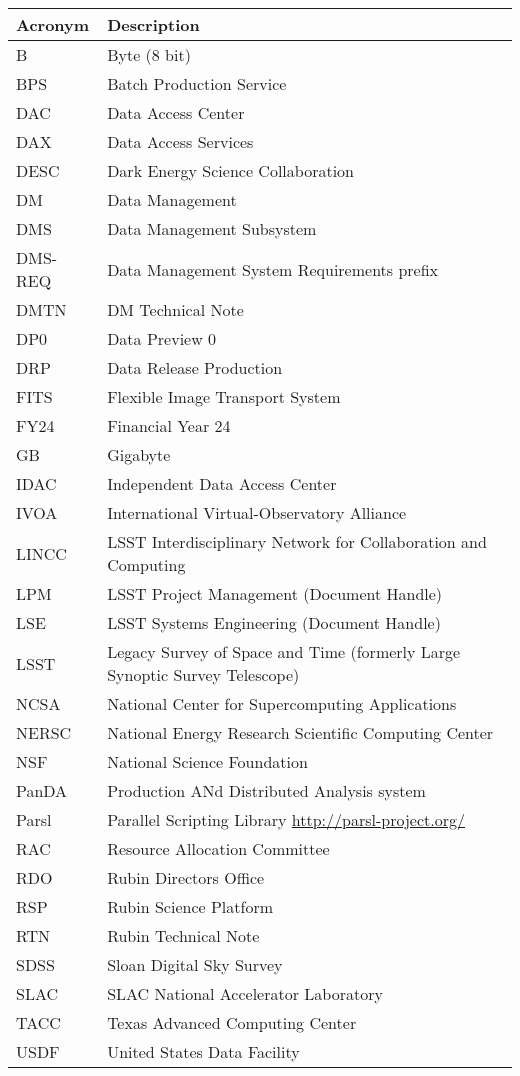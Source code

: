 \addtocounter{table}{-1}
\begin{longtable}{p{}p{}}\hline
\textbf{Acronym} & \textbf{Description}  \\\hline

B & Byte (8 bit) \\\hline
BPS & Batch Production Service \\\hline
DAC & Data Access Center \\\hline
DAX & Data Access Services \\\hline
DESC & Dark Energy Science Collaboration \\\hline
DM & Data Management \\\hline
DMS & Data Management Subsystem \\\hline
DMS-REQ & Data Management System Requirements prefix \\\hline
DMTN & DM Technical Note \\\hline
DP0 & Data Preview 0 \\\hline
DRP & Data Release Production \\\hline
FITS & Flexible Image Transport System \\\hline
FY24 & Financial Year 24 \\\hline
GB & Gigabyte \\\hline
IDAC & Independent Data Access Center \\\hline
IVOA & International Virtual-Observatory Alliance \\\hline
LINCC & LSST Interdisciplinary Network for Collaboration and Computing \\\hline
LPM & LSST Project Management (Document Handle) \\\hline
LSE & LSST Systems Engineering (Document Handle) \\\hline
LSST & Legacy Survey of Space and Time (formerly Large Synoptic Survey Telescope) \\\hline
NCSA & National Center for Supercomputing Applications \\\hline
NERSC & National Energy Research Scientific Computing Center \\\hline
NSF & National Science Foundation \\\hline
PanDA &  Production ANd Distributed Analysis system \\\hline
Parsl & Parallel Scripting Library \url{http://parsl-project.org/} \\\hline
RAC & Resource Allocation Committee \\\hline
RDO & Rubin Directors Office \\\hline
RSP & Rubin Science Platform \\\hline
RTN & Rubin Technical Note \\\hline
SDSS & Sloan Digital Sky Survey \\\hline
SLAC & SLAC National Accelerator Laboratory \\\hline
TACC & Texas Advanced Computing Center \\\hline
USDF & United States Data Facility \\\hline
\end{longtable}
